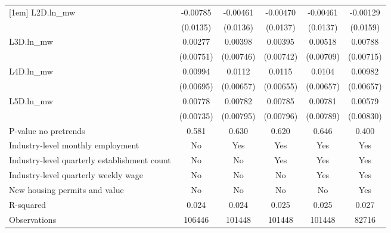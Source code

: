 {\begin{tabular}{l*{5}{c}}
[1em]
L2D.ln\_mw & -0.00785         & -0.00461         & -0.00470         & -0.00461         & -0.00129         \\
          & (0.0135)         & (0.0136)         & (0.0137)         & (0.0137)         & (0.0159)         \\
[1em]
L3D.ln\_mw &  0.00277         &  0.00398         &  0.00395         &  0.00518         &  0.00788         \\
          &(0.00751)         &(0.00746)         &(0.00742)         &(0.00709)         &(0.00715)         \\
[1em]
L4D.ln\_mw &  0.00994         &   0.0112\sym{*}  &   0.0115\sym{*}  &   0.0104         &  0.00982         \\
          &(0.00695)         &(0.00657)         &(0.00655)         &(0.00657)         &(0.00657)         \\
[1em]
L5D.ln\_mw &  0.00778         &  0.00782         &  0.00785         &  0.00781         &  0.00579         \\
          &(0.00735)         &(0.00795)         &(0.00796)         &(0.00789)         &(0.00830)         \\
\hline
P-value no pretrends&    0.581         &    0.630         &    0.620         &    0.646         &    0.400         \\
Industry-level monthly employment&       No         &      Yes         &      Yes         &      Yes         &      Yes         \\
Industry-level quarterly establishment count&       No         &       No         &      Yes         &      Yes         &      Yes         \\
Industry-level quarterly weekly wage&       No         &       No         &       No         &      Yes         &      Yes         \\
New housing permits and value&       No         &       No         &       No         &       No         &      Yes         \\
R-squared &    0.024         &    0.024         &    0.025         &    0.025         &    0.027         \\
Observations&   106446         &   101448         &   101448         &   101448         &    82716         \\
\hline\hline
\end{tabular}
}
